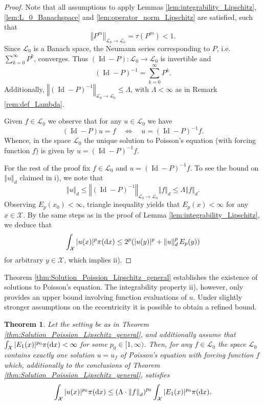 \documentclass[12pt]{article}
\theoremstyle{plain}
\newtheorem{thm}{Theorem}[section]
\renewcommand{\d}{{\rm d}}
\newcommand{\norm}[1]{\left\Vert #1 \right\Vert}
\newcommand{\cX}{\mathcal{X}}
\DeclareMathOperator{\Id}{\text{Id}}
\begin{document}
{\begin{proof}
Note that all assumptions to apply Lemmas \ref{lem:integrability_Lipschitz}, \ref{lem:L_0_Banachspace} and \ref{lem:operator_norm_Lipschitz} are satisfied, such that 
\[
\norm{P^m}_{\mathscr{L}_0 \to \mathscr{L}_0} = \tau(P^m) <1.
\]
Since $\mathscr{L}_0$ is a Banach space, the Neumann series corresponding to $P$, i.e. $\sum_{k=0}^\infty P^k$, converges. Thus $(\Id-P) \colon \mathscr{L}_0 \to \mathscr{L}_0$ is invertible and  
\[
(\Id - P)^{-1} = \sum_{k=0}^\infty P^k. 
\]
Additionally, $\norm{(\Id - P)^{-1}}_{\mathscr{L}_0 \to \mathscr{L}_0} \leq \Lambda$, with $\Lambda < \infty$ as in Remark \ref{rem:def_Lambda}. 

Given $f \in \mathscr{L}_0$ we observe that for any $u \in \mathscr{L}_0$ we have
\[
(\Id - P)u = f\quad \Longleftrightarrow\quad u = (\Id-P)^{-1}f.
\]
Whence, in the space $\mathscr{L}_0$ the unique solution to Poisson's equation (with forcing function $f$) is given by $u = (\Id-P)^{-1}f$. 

For the rest of the proof fix $f\in \mathscr{L}_0$ and $u= (\Id-P)^{-1}f$.
To see the bound on $\norm{u}_d$ claimed in i), we note that 
\[
\norm{u}_d \leq \norm{(\Id - P)^{-1}}_{\mathscr{L}_0 \to \mathscr{L}_0} \norm{f}_d \leq \Lambda \norm{f}_d.
\]
Observing $E_p(x_0)< \infty$, triangle inequality yields that $E_p(x)< \infty$ for any $x \in \cX$. By the same steps as in the proof of Lemma \ref{lem:integrability_Lipschitz}, we deduce that 
\[
\int_\cX \vert u(x) \vert^p \pi(\d x) \leq 2^p (\vert u(y)\vert^p + \norm{u}_d^p E_p(y))
\]
for arbitrary $y \in \cX$, which implies ii). 
\end{proof}

Theorem \ref{thm:Solution_Poission_Lipschitz_general} establishes the existence of solutions to Poisson's equation. The integrability property ii), however, only provides an upper bound involving function evaluations of $u$.
Under slightly stronger assumptions on the eccentricity it is possible to obtain a refined bound. 
\begin{thm}\label{thm:Solution_Poisson_with_L_p_bound}
Let the setting be as in Theorem \ref{thm:Solution_Poission_Lipschitz_general}, and additionally assume that $\int_\cX \vert E_1(x)\vert^{p_0} \pi(\d x) < \infty$ for some $p_0\in [1, \infty)$. 
Then, for any $f \in \mathscr{L}_0$ the space $\mathscr{L}_0$ contains exactly one solution $u = u_f$ of Poisson's equation with forcing function $f$ which, additionally to the conclusions of Theorem \ref{thm:Solution_Poission_Lipschitz_general}, satisfies
\[
\int_\cX \vert u(x) \vert^{p_0} \pi(\d x) \leq \left( \Lambda \cdot \norm{f}_d \right)^{p_0} \int_\cX \vert E_1(x)\vert^{p_0} \pi(\d x). 
\]
\end{thm}

}
\end{document}
